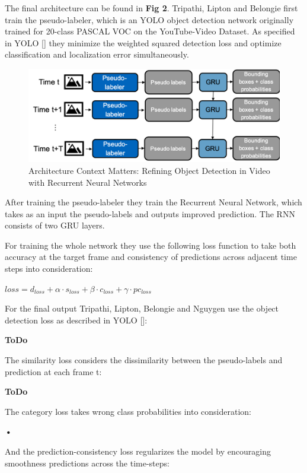 \documentclass[conference]{IEEEtran}
\begin{document}
The final architecture can be found in \textbf{Fig 2}. Tripathi, Lipton and Belongie first train the pseudo-labeler, which is an YOLO object detection network originally trained for 20-class PASCAL VOC on the YouTube-Video Dataset. As specified in YOLO [] they minimize the weighted squared detection loss and optimize classification and localization error simultaneously. 

\begin{figure} [h]
\includegraphics[width=\columnwidth]{ContextMatters}
\caption{Architecture Context Matters: Refining Object Detection in Video with Recurrent Neural Networks}
\end{figure}

After training the pseudo-labeler they train the Recurrent Neural Network, which takes as an input the pseudo-labels and outputs improved prediction. The RNN consists of two GRU layers. \newline

For training the whole network they use the following loss function to take both accuracy at the target frame and consistency of predictions across adjacent time steps into consideration: \newline

$ loss = d_{loss} + \alpha \cdot s_{loss} + \beta \cdot c_{loss} + \gamma \cdot pc_{loss} $ \newline

For the final output Tripathi, Lipton, Belongie and Nguygen use the object detection loss as described in YOLO []:

\textbf{ToDo}

The similarity loss considers the dissimilarity between the pseudo-labels and prediction at each frame t:

\textbf{ToDo}

The category loss takes wrong class probabilities into consideration:  

\textbf{•}

And the prediction-consistency loss regularizes the model by encouraging smoothness predictions across the time-steps:
\end{document}
